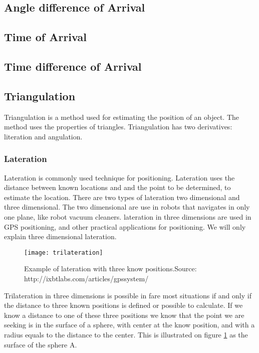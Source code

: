   \subsection{Angle difference of Arrival}

  \subsection{Time of Arrival}

  \subsection{Time difference of Arrival}

  \subsection{Triangulation}

  Triangulation is a method used for estimating the position of an object. The method uses the properties of triangles. Triangulation has two derivatives: literation and angulation.

 \subsubsection{Lateration}

  Lateration is commonly used technique for positioning.  Lateration uses the distance between known locations and and the point to be determined, to estimate the location.\cite{tri_lateration}  There are two types of lateration two dimensional and three dimensional. The two dimensional are use in robots that navigates in only one plane, like robot vacuum cleaners. 
  lateration in three dimensions are used in GPS positioning, and other practical applications for positioning.
  We will only explain three dimensional lateration. 
  \begin{figure}[ht!]
  \centering
  \texttt{[image: trilateration]}
  \caption{Example of lateration with three know positions.\newline Source: http://ixbtlabs.com/articles/gpssystem/}
  \label{fig:trilateration}
  \end{figure}
  

  Trilateration in three dimensions is possible in fare most situations if and only if the distance to three known positions is defined or possible to calculate.
  If we know a distance to one of these three positions we know that the point we are seeking is in the surface of a sphere, with center at the know position, and with a radius equals to the distance to the center. This is illustrated on figure \ref{fig:trilateration} as the surface of the sphere A.

